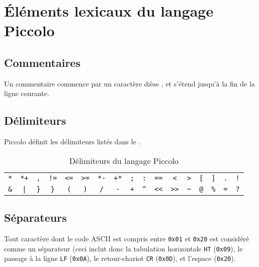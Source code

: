 
\cleardoublepage

\chapter{Éléments lexicaux du langage Piccolo}

\thispagestyle{empty}


\section{Commentaires}

Un commentaire commence par un caractère dièse \piccolo{\#}, et s’étend jusqu’à la fin de la ligne courante.

\section{Délimiteurs}

Piccolo définit les délimiteurs listés dans le .

\begin{table}[!t]
  \centering
  \begin{tabular}{|c|c|c|c|c|c|c|c|c|c|c|c|c|c|c|c|c|}
    \texttt{*}  & \texttt{*+} & \texttt{,}  & \texttt{!=} & \texttt{<=} & \texttt{>=} & \texttt{*-} & \texttt{+*} & \texttt{;} & \texttt{:} & \texttt{==} & \texttt{<} & \texttt{>} & \texttt{[} & \texttt{]} & \texttt{.} & \texttt{!} \\
    \texttt{\&} & \texttt{|}  & \texttt{\}} & \texttt{\}} & \texttt{(}  & \texttt{)}  & \texttt{/}  & \texttt{-} & \texttt{+} & \texttt{\textasciicircum} & \texttt{<{}<} & \texttt{>{}>} & \texttt{\textasciitilde} & \texttt{@} & \texttt{\%} & \texttt{=} & \texttt{?} \\
  \end{tabular}
  \caption{Délimiteurs du langage Piccolo}
  \ligne
\end{table}

\section{Séparateurs}

Tout caractère dont le code ASCII est compris entre \texttt{0x01} et \texttt{0x20} est considéré comme un séparateur (ceci inclut donc la tabulation horizontale \texttt{HT} (\texttt{0x09}), le passage à la ligne \texttt{LF} (\texttt{0x0A}), le retour-chariot \texttt{CR} (\texttt{0x0D}), et l’espace (\texttt{0x20}).

